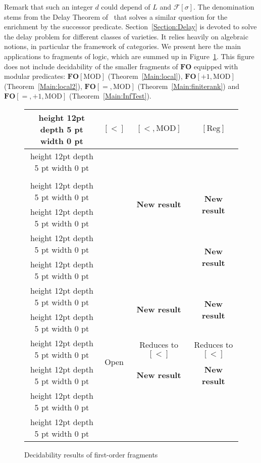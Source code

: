 \documentclass[submission,hidelink]{dmtcs-episciences}
\newcommand{\cF}{\mathcal{F}}
\newcommand{\FO}{\mathbf{FO}}
\newcommand{\BS}{\mathbf{{\cal B}\Sigma}}
\newcommand{\Reg}{\mathrm{Reg}}
\newcommand{\MOD}{\mathrm{MOD}}
\newcommand{\tvi}{\vrule height 12pt depth 5 pt width 0 pt}
\begin{document}
\noindent
Remark that such an integer $d$ could depend of $L$ and $\cF[\sigma]$. The denomination stems from the Delay Theorem of~\cite{Straubing85} that solves a similar question for the enrichment
by the
successor predicate.
Section~\ref{Section:Delay} is devoted to solve the delay problem for different classes of varieties.
It relies heavily on algebraic notions, in particular the framework of categories.
We present here the main applications to fragments of logic, which are summed up in Figure~\ref{TableauFinal}.
This figure does not include decidability of the smaller fragments of $\FO$ equipped with modular predicates: $\FO[\MOD]$ (Theorem~\ref{Main:local}), $\FO[+1,\MOD]$ (Theorem~\ref{Main:local2}), $\FO[=,\MOD]$ (Theorem~\ref{Main:finiterank}) and $\FO[=,+1,\MOD]$ (Theorem~\ref{Main:InfTest}).
\newcommand{\newresult}{\multirow{2}{60pt}{\textbf{New result}}}
\begin{figure}

\centering

\begin{tabular}{|c|c|c|c|}
\hline
\tvi & $[<]$ & $[<,\MOD]$ & $[\Reg]$ \\
\hline 
\tvi \multirow{2}{60pt}{ $\BS_1=\FO^2_1$} & \cite{SI75} & \multirow{2}{110pt}{\cite{CPS06b}}& \multirow{2}{100pt}{ \cite{MPT00}} \\
&\cite{TO82}&&\\
 \hline
\tvi \multirow{2}{60pt}{ $\FO^2_k$} & \cite{KS12} &  \newresult &  \newresult\\
\tvi & \cite{KW12} & & \\
 \hline
 
 \tvi \multirow{2}{60pt}{\hfil $\FO^2$} &  \multirow{2}{120pt}{\cite{TW98}} & \multirow{2}{130pt}{\cite{DP13}} &\newresult \\
 \tvi & & & \\
 \hline
 
  \tvi \multirow{2}{60pt}{\hfil $\BS_2$} &  \multirow{2}{110pt}{\cite{PZ14}} & \newresult & \newresult \\
  \tvi & & & \\
 \hline
 
 \tvi \multirow{2}{60pt}{\hfil $\BS_k$} & \multirow{2}{40pt}{Open }& Reduces to $[<]$ & Reduces to $[<]$\\
\tvi & & \textbf{New result}& \textbf{New result} \\
\hline 

 \tvi \multirow{2}{60pt}{\hfil $\FO$} & \cite{MP71} &   \multirow{2}{75pt}{\cite{Straubing94}}  &  \multirow{2}{110pt}{\cite{Bar92}} \\
\tvi & \cite{Schutzenberger65} &  & \\
\hline 
\end{tabular}
\caption{Decidability results of first-order fragments}\label{TableauFinal}
\end{figure}
\end{document}
